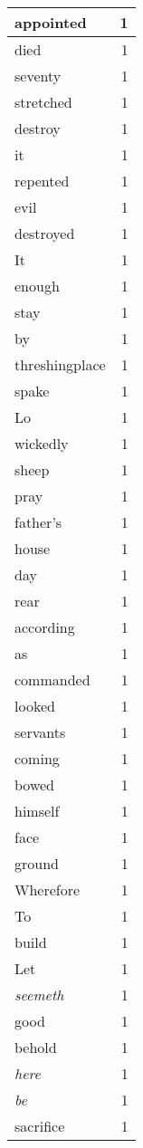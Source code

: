 \begin{center}
\begin{longtable}{l|r}
appointed & 1 \\ \hline
died & 1 \\ \hline
seventy & 1 \\ \hline
stretched & 1 \\ \hline
destroy & 1 \\ \hline
it & 1 \\ \hline
repented & 1 \\ \hline
evil & 1 \\ \hline
destroyed & 1 \\ \hline
It & 1 \\ \hline
enough & 1 \\ \hline
stay & 1 \\ \hline
by & 1 \\ \hline
threshingplace & 1 \\ \hline
spake & 1 \\ \hline
Lo & 1 \\ \hline
wickedly & 1 \\ \hline
sheep & 1 \\ \hline
pray & 1 \\ \hline
father's & 1 \\ \hline
house & 1 \\ \hline
day & 1 \\ \hline
rear & 1 \\ \hline
according & 1 \\ \hline
as & 1 \\ \hline
commanded & 1 \\ \hline
looked & 1 \\ \hline
servants & 1 \\ \hline
coming & 1 \\ \hline
bowed & 1 \\ \hline
himself & 1 \\ \hline
face & 1 \\ \hline
ground & 1 \\ \hline
Wherefore & 1 \\ \hline
To & 1 \\ \hline
build & 1 \\ \hline
Let & 1 \\ \hline
\emph{seemeth} & 1 \\ \hline
good & 1 \\ \hline
behold & 1 \\ \hline
\emph{here} & 1 \\ \hline
\emph{be} & 1 \\ \hline
sacrifice & 1 \\ \hline

\end{longtable}
\end{center}
